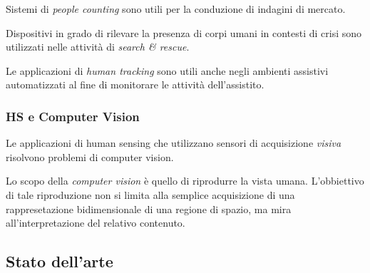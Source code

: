                 Sistemi di \emph{people counting} sono utili per la conduzione di indagini di mercato.

                Dispositivi in grado di rilevare la presenza di corpi umani in contesti di crisi sono utilizzati nelle attività di \emph{search & rescue}.

                Le applicazioni di \emph{human tracking} sono utili anche negli ambienti assistivi automatizzati al fine di monitorare le attività dell'assistito.

            \subsubsection{HS e Computer Vision}
                Le applicazioni di human sensing che utilizzano sensori di acquisizione \emph{visiva} risolvono problemi di computer vision.

                Lo scopo della \emph{computer vision} è quello di riprodurre la vista umana. L'obbiettivo di tale riproduzione non si limita alla semplice acquisizione di una rappresetazione bidimensionale di una regione di spazio, ma mira all'interpretazione del relativo contenuto.

        \subsection{Stato dell'arte}
